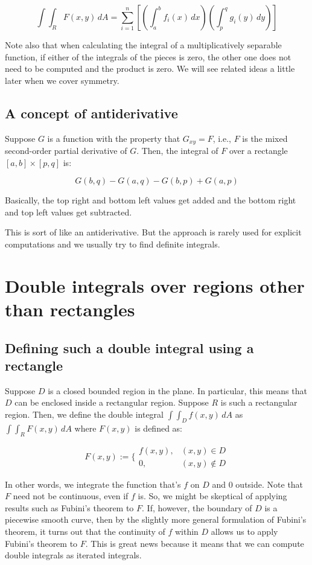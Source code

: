 \documentclass[10pt]{amsart}
\begin{document}
$$\int \int_R F(x,y) \, dA = \sum_{i=1}^n \left[\left(\int_a^b f_i(x) \, dx \right) \left(\int_p^q g_i(y) \, dy \right)\right]$$

Note also that when calculating the integral of a multiplicatively
separable function, if either of the integrals of the pieces is zero,
the other one does not need to be computed and the product is zero. We
will see related ideas a little later when we cover symmetry.
\subsection{A concept of antiderivative}

Suppose $G$ is a function with the property that $G_{xy} = F$, i.e.,
$F$ is the mixed second-order partial derivative of $G$. Then, the
integral of $F$ over a rectangle $[a,b] \times [p,q]$ is:

$$G(b,q) - G(a,q) - G(b,p) + G(a,p)$$

Basically, the top right and bottom left values get added and the
bottom right and top left values get subtracted.

This is sort of like an antiderivative. But the approach is rarely
used for explicit computations and we usually try to find definite
integrals.
\section{Double integrals over regions other than rectangles}

\subsection{Defining such a double integral using a rectangle}

Suppose $D$ is a closed bounded region in the plane. In
particular, this means that $D$ can be enclosed inside a
rectangular region. Suppose $R$ is such a rectangular region. Then, we
define the double integral $\int \int_D f(x,y) \, dA$ as $\int
\int_R F(x,y) \, dA$ where $F(x,y)$ is defined as:

$$F(x,y) := \lbrace\begin{array}{rl} f(x,y), & (x,y) \in D\\ 0, & (x,y) \notin D \end{array}$$

In other words, we integrate the function that's $f$ on $D$ and $0$
outside. Note that $F$ need not be continuous, even if $f$ is. So, we
might be skeptical of applying results such as Fubini's theorem to
$F$. If, however, the boundary of $D$ is a piecewise smooth curve,
then by the slightly more general formulation of Fubini's theorem, it
turns out that the continuity of $f$ within $D$ allows us to apply
Fubini's theorem to $F$. This is great news because it means that we
can compute double integrals as iterated integrals.
\end{document}
